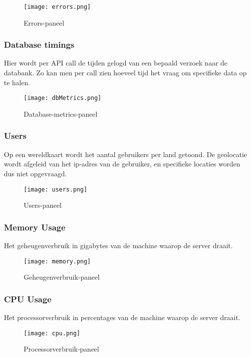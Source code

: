 \begin{figure}[h]
	\centering
	\texttt{[image: errors.png]}
	\caption{Errors-paneel}
	\label{fig:errors}
\end{figure}

\subsubsection{Database timings}
\label{sec:dbtimings}
Hier wordt per API call de tijden gelogd van een bepaald verzoek naar de databank. Zo kan men per call zien hoeveel tijd het vraag om specifieke data op te halen.

\begin{figure}[h]
	\centering
	\texttt{[image: dbMetrics.png]}
	\caption{Database-metrics-paneel}
	\label{fig:dbMetrics}
\end{figure}

\subsubsection{Users}
\label{sec:users}
Op een wereldkaart wordt het aantal gebruikers per land getoond. De geolocatie wordt afgeleid van het ip-adres van de gebruiker, en specifieke locaties worden dus niet opgevraagd.

\begin{figure}[h]
	\centering
	\texttt{[image: users.png]}
	\caption{Users-paneel}
	\label{fig:users}
\end{figure}

\subsubsection{Memory Usage}
\label{sec:memory}
Het geheugenverbruik in gigabytes van de machine waarop de server draait.
\begin{figure}[h]
	\centering
	\texttt{[image: memory.png]}
	\caption{Geheugenverbruik-paneel}
	\label{fig:mem}
\end{figure}

\subsubsection{CPU Usage}
\label{sec:cpu}
Het processorverbruik in percentages van de machine waarop de server draait.

\begin{figure}[h]
	\centering
	\texttt{[image: cpu.png]}
	\caption{Processorverbruik-paneel}
	\label{fig:cpu}
\end{figure}

